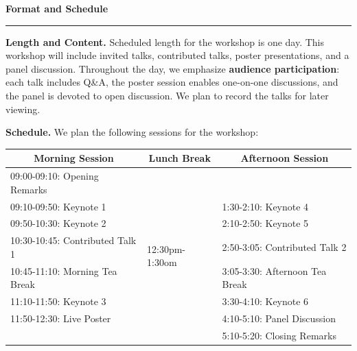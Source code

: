 \documentclass{article}
\newcommand{\sectiontitle}[1]{\noindent\textbf{\textcolor{neuripsblue}{#1}}\vspace{0.1cm}\hrule\vspace{0.2cm}}
\begin{document}
\sectiontitle{Format and Schedule}
\vspace{-2pt}
\textbf{Length and Content.}
Scheduled length for the workshop is one day. This workshop will include invited talks, contributed talks, poster presentations, and a panel discussion. Throughout the day, we emphasize \textbf{audience participation}: each talk includes Q\&A, the poster session enables one-on-one discussions, and the panel is devoted to open discussion. We plan to record the talks for later viewing. 

\textbf{Schedule.}
We plan the following sessions for the workshop:\\
\begingroup
  \hfill
    \begin{tabular}{l|l|l}
    \toprule
    \multicolumn{1}{c|}{\textbf{Morning Session}}  & \multicolumn{1}{c|}{\textbf{Lunch Break}} & \multicolumn{1}{c}{\textbf{Afternoon Session}}  \\
    \midrule
    09:00-09:10: Opening Remarks &   \multirow{8}{*}{12:30pm-1:30om} &  \\
    09:10-09:50: Keynote 1 & & 1:30-2:10: Keynote 4  \\
    09:50-10:30: Keynote 2 & & 2:10-2:50: Keynote 5  \\
    10:30-10:45: Contributed Talk 1 & & 2:50-3:05: Contributed Talk 2  \\
    10:45-11:10: Morning Tea Break & & 3:05-3:30: Afternoon Tea Break   \\
    11:10-11:50: Keynote 3 & & 3:30-4:10: Keynote 6  \\
    11:50-12:30: Live Poster & & 4:10-5:10: Panel Discussion  \\
     & & 5:10-5:20: Closing Remarks   \\
    \bottomrule
    \end{tabular}%
\hfill
\endgroup

\newpage
 
\newpage
 
\end{document}
